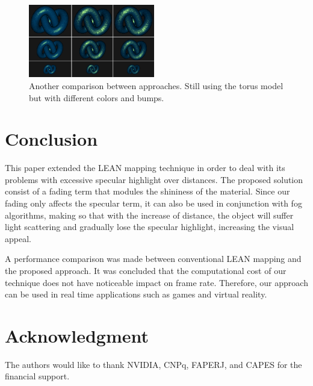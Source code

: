 \documentclass[10pt, conference]{IEEEtran}
\begin{document}
\begin{figure}[h]
	\includegraphics[width=0.49\textwidth]{figs/BLS4.png}
	\caption{Another comparison between approaches. Still using the torus model but with different colors and bumps.}
	\label{fig:BLS4}
\end{figure}

\section{Conclusion}
\label{sec:conclusion}
%
This paper extended the LEAN mapping technique in order to deal with its problems with excessive specular highlight over distances. The proposed solution consist of a fading term that modules the shininess of the material. Since our fading only affects the specular term, it can also be used in conjunction with fog algorithms, making so that with the increase of distance, the object will suffer light scattering and gradually lose the specular highlight, increasing the visual appeal.

A performance comparison was made between conventional LEAN mapping and the proposed approach. It was concluded that the computational cost of our technique does not have noticeable impact on frame rate. Therefore, our approach can be used in real time applications such as games and virtual reality.


\iffinal
\section*{Acknowledgment}
%
The authors would like to thank NVIDIA, CNPq, FAPERJ, and CAPES for the financial support.
\fi




\end{document}
